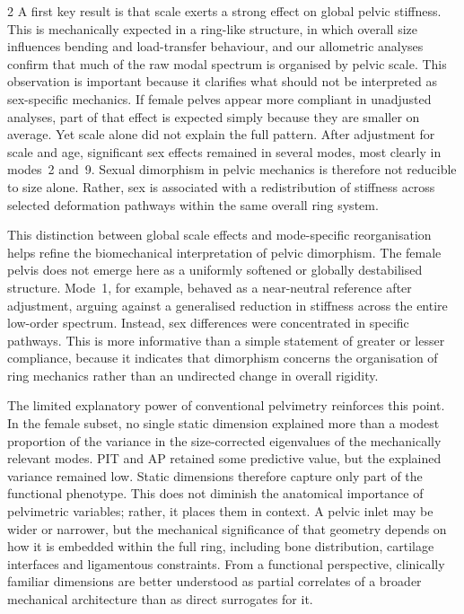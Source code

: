 \documentclass[openacc]{rsproca_new}
\begin{document}
\begin{multicols}{2}
A first key result is that scale exerts a strong effect on global pelvic stiffness. This is mechanically expected in a ring-like structure, in which overall size influences bending and load-transfer behaviour, and our allometric analyses confirm that much of the raw modal spectrum is organised by pelvic scale. This observation is important because it clarifies what should not be interpreted as sex-specific mechanics. If female pelves appear more compliant in unadjusted analyses, part of that effect is expected simply because they are smaller on average. Yet scale alone did not explain the full pattern. After adjustment for scale and age, significant sex effects remained in several modes, most clearly in modes~2 and~9. Sexual dimorphism in pelvic mechanics is therefore not reducible to size alone. Rather, sex is associated with a redistribution of stiffness across selected deformation pathways within the same overall ring system.

This distinction between global scale effects and mode-specific reorganisation helps refine the biomechanical interpretation of pelvic dimorphism. The female pelvis does not emerge here as a uniformly softened or globally destabilised structure. Mode~1, for example, behaved as a near-neutral reference after adjustment, arguing against a generalised reduction in stiffness across the entire low-order spectrum. Instead, sex differences were concentrated in specific pathways. This is more informative than a simple statement of greater or lesser compliance, because it indicates that dimorphism concerns the organisation of ring mechanics rather than an undirected change in overall rigidity.

The limited explanatory power of conventional pelvimetry reinforces this point. In the female subset, no single static dimension explained more than a modest proportion of the variance in the size-corrected eigenvalues of the mechanically relevant modes. PIT and AP retained some predictive value, but the explained variance remained low. Static dimensions therefore capture only part of the functional phenotype. This does not diminish the anatomical importance of pelvimetric variables; rather, it places them in context. A pelvic inlet may be wider or narrower, but the mechanical significance of that geometry depends on how it is embedded within the full ring, including bone distribution, cartilage interfaces and ligamentous constraints. From a functional perspective, clinically familiar dimensions are better understood as partial correlates of a broader mechanical architecture than as direct surrogates for it.


\end{multicols}
\end{document}
